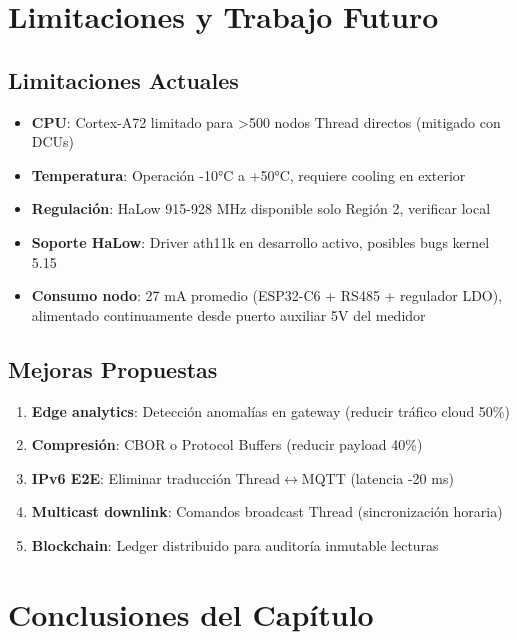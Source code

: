 \section{Limitaciones y Trabajo Futuro}

\subsection{Limitaciones Actuales}

\begin{itemize}
    \item \textbf{CPU}: Cortex-A72 limitado para >500 nodos Thread directos (mitigado con DCUs)
    \item \textbf{Temperatura}: Operación -10°C a +50°C, requiere cooling en exterior
    \item \textbf{Regulación}: HaLow 915-928 MHz disponible solo Región 2, verificar local
    \item \textbf{Soporte HaLow}: Driver ath11k en desarrollo activo, posibles bugs kernel 5.15
    \item \textbf{Consumo nodo}: 27 mA promedio (ESP32-C6 + RS485 + regulador LDO), alimentado continuamente desde puerto auxiliar 5V del medidor
\end{itemize}

\subsection{Mejoras Propuestas}

\begin{enumerate}
    \item \textbf{Edge analytics}: Detección anomalías en gateway (reducir tráfico cloud 50\%)
    \item \textbf{Compresión}: CBOR o Protocol Buffers (reducir payload 40\%)
    \item \textbf{IPv6 E2E}: Eliminar traducción Thread$\leftrightarrow$MQTT (latencia -20 ms)
    \item \textbf{Multicast downlink}: Comandos broadcast Thread (sincronización horaria)
    \item \textbf{Blockchain}: Ledger distribuido para auditoría inmutable lecturas
\end{enumerate}

\section{Conclusiones del Capítulo}

